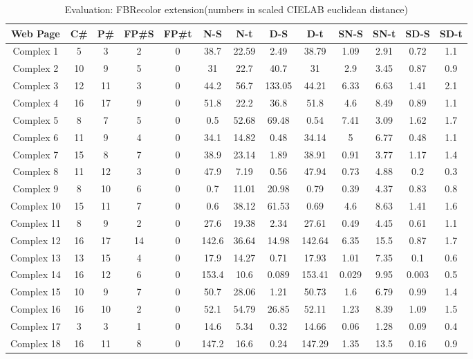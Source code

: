 \begin{table}[!htb]
\caption{Evaluation: FBRecolor extension(numbers in scaled CIELAB euclidean distance)}
\centering
\begin{tabular}{c c c c c c c c c c c c c}
\hline\hline
Web Page & C\# & P\# & FP\#S & FP\#t & N-S & N-t & D-S & D-t & SN-S & SN-t & SD-S & SD-t\\ [0.5ex]
\hline
Complex 1&5&3&2&0&38.7&22.59&2.49&38.79&1.09&2.91&0.72&1.1\\
Complex 2&10&9&5&0&31&22.7&40.7&31&2.9&3.45&0.87&0.9\\
Complex 3&12&11&3&0&44.2&56.7&133.05&44.21&6.33&6.63&1.41&2.1\\
Complex 4&16&17&9&0&51.8&22.2&36.8&51.8&4.6&8.49&0.89&1.1\\
Complex 5&8&7&5&0&0.5&52.68&69.48&0.54&7.41&3.09&1.62&1.7\\
Complex 6&11&9&4&0&34.1&14.82&0.48&34.14&5&6.77&0.48&1.1\\
Complex 7&15&8&7&0&38.9&23.14&1.89&38.91&0.91&3.77&1.17&1.4\\
Complex 8&11&12&3&0&47.9&7.19&0.56&47.94&0.73&4.88&0.2&0.3\\
Complex 9&8&10&6&0&0.7&11.01&20.98&0.79&0.39&4.37&0.83&0.8\\
Complex 10&15&11&7&0&0.6&38.12&61.53&0.69&4.6&8.63&1.41&1.6\\
Complex 11&8&9&2&0&27.6&19.38&2.34&27.61&0.49&4.45&0.61&1.1\\
Complex 12&16&17&14&0&142.6&36.64&14.98&142.64&6.35&15.5&0.87&1.7\\
Complex 13&13&15&4&0&17.9&14.27&0.71&17.93&1.01&7.35&0.1&0.6\\
Complex 14&16&12&6&0&153.4&10.6&0.089&153.41&0.029&9.95&0.003&0.5\\
Complex 15&10&9&7&0&50.7&28.06&1.21&50.73&1.6&6.79&0.99&1.4\\
Complex 16&16&10&2&0&52.1&54.79&26.85&52.11&1.23&8.39&1.09&1.5\\
Complex 17&3&3&1&0&14.6&5.34&0.32&14.66&0.06&1.28&0.09&0.4\\
Complex 18&16&11&8&0&147.2&16.6&0.24&147.29&1.35&13.5&0.16&0.9\\[1ex]
\hline
\end{tabular}
\label{table:nonlin}
\end{table}
